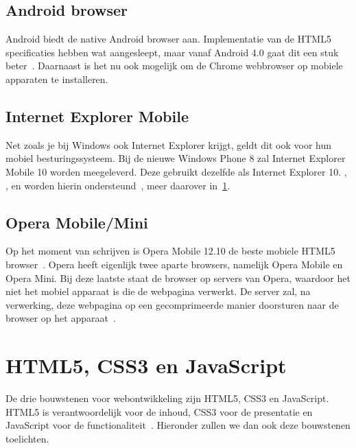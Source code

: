 \subsection{Android browser}
\label{sec:android-browser}
Android biedt de native Android browser aan. 
Implementatie van de HTML5 specificaties hebben wat aangesleept, maar vanaf Android 4.0 gaat dit een stuk beter~\cite{Hales2012}. 
Daarnaast is het nu ook mogelijk om de Chrome webbrowser op mobiele apparaten te installeren.

\subsection{Internet Explorer Mobile}
Net zoals je bij Windows ook Internet Explorer krijgt, geldt dit ook voor hun mobiel  besturingssysteem. 
Bij de nieuwe Windows Phone 8 zal Internet Explorer Mobile 10 worden meegeleverd. Deze gebruikt dezelfde  als Internet Explorer 10. , ,  en  worden hierin ondersteund~\cite{Hales2012}, meer daarover in~\ref{sec:html5-css3-js}.

\subsection{Opera Mobile/Mini}
Op het moment van schrijven is Opera Mobile 12.10 de beste mobiele HTML5 browser~\cite{Sights2012}. 
Opera heeft eigenlijk twee aparte browsers, namelijk Opera Mobile en Opera Mini. 
Bij deze laatste staat de browser  op servers van Opera, waardoor het niet het mobiel apparaat is die de webpagina verwerkt. 
De server zal, na verwerking, deze webpagina op een gecomprimeerde manier doorsturen naar de browser op het apparaat~\cite{PhilDutson2012}.



\section{HTML5, CSS3 en JavaScript}
\label{sec:html5-css3-js}
De drie bouwstenen voor webontwikkeling zijn HTML5, CSS3 en JavaScript. 
HTML5 is verantwoordelijk voor de inhoud, CSS3 voor de presentatie en JavaScript voor de functionaliteit~\cite{PhilDutson2012}. 
Hieronder zullen we dan ook deze bouwstenen toelichten.

